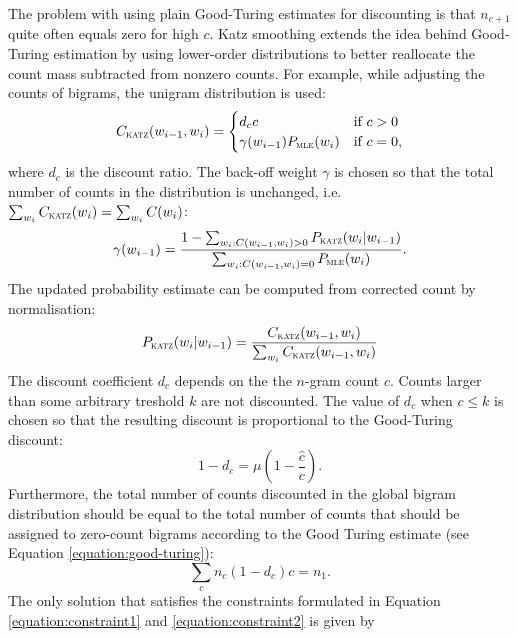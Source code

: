 	The problem with using plain Good-Turing estimates for discounting is that $n_{c+1}$ quite often equals zero for high $c$. Katz smoothing extends the idea behind Good-Turing estimation by using lower-order distributions to better reallocate the count mass subtracted from nonzero counts. For example, while adjusting the counts of bigrams, the unigram distribution is used: 
	\begin{equation}
		C_{\textsc{katz}}(w_{i-1}, w_{i})=
		\begin{cases}
			d_{c}c & \text{if } c>0 \\
			\gamma(w_{i-1})P_{\textsc{mle}}(w_{i}) & \text{if } c=0,
		\end{cases}
	\end{equation}
	where $d_{c}$ is the discount ratio. The back-off weight $\gamma$ is chosen so that the total number of counts in the distribution is unchanged, i.e. $\sum_{w_{i}}C_{\textsc{katz}}(w_{i})=\sum_{w_{i}}C(w_{i})$:
	\begin{equation}
		\gamma(w_{i-1})=\frac{1-\sum_{w_{i}: C(w_{i-1}, w_{i})>0}P_{\textsc{katz}}(w_{i}|w_{i-1})}{\sum_{w_{i}: C(w_{i-1}, w_{i})=0}P_{\textsc{mle}}(w_{i})}.
	\end{equation}
	The updated probability estimate can be computed from corrected count by normalisation:
	\begin{equation}
		P_{\textsc{katz}}(w_{i}|w_{i-1})=\frac{C_{\textsc{katz}}(w_{i-1}, w_{i})}{\sum_{w_{i}}C_{\textsc{katz}}(w_{i-1}, w_{i})}
	\end{equation}
	The discount coefficient $d_{c}$ depends on the the \mbox{$n$-gram} count $c$. Counts larger than some arbitrary treshold $k$ are not discounted. The value of $d_{c}$ when $c\leq k$ is chosen so that the resulting discount is proportional to the Good-Turing discount: 
	\begin{equation}
		1-d_{c}=\mu(1-\frac{\hat{c}}{c}).
		\label{equation:constraint1}
	\end{equation}
	Furthermore, the total number of counts discounted in the global bigram distribution should be equal to the total number of counts that should be assigned to zero-count bigrams according to the Good Turing estimate (see Equation \ref{equation:good-turing}):
	\begin{equation}
		\sum_{c}n_{c}(1-d_{c})c=n_{1}.
		\label{equation:constraint2}
	\end{equation}
	The only solution that satisfies the constraints formulated in Equation \ref{equation:constraint1} and \ref{equation:constraint2} is given by
